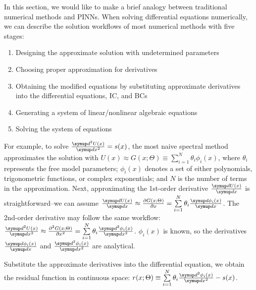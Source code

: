 In this section, we would like to make a brief analogy between traditional numerical methods and PINNs.
When solving differential equations numerically, we can describe the solution workflows of most numerical methods with five stages:
\begin{enumerate}[nolistsep]
    \item Designing the approximate solution with undetermined parameters
    \item Choosing proper approximation for derivatives
    \item Obtaining the modified equations by substituting approximate derivatives into the differential equations, IC, and BCs
    \item Generating a system of linear/nonlinear algebraic equations
    \item Solving the system of equations
\end{enumerate}

For example, to solve $\frac{\diff^2 U(x)}{\diff x^2}=s(x)$, the most naive spectral method \cite{trefethen_spectral_2000} approximates the solution with $U(x)\approx G(x; \Theta)\equiv\sum\limits_{i=1}^{N}\theta_i\phi_i(x)$, where $\theta_i$ represents the free model parameters; $\phi_i(x)$ denotes a set of either polynomials, trigonometric functions, or complex exponentials; and $N$ is the number of terms in the approximation.
Next, approximating the 1st-order derivative $\frac{\diff U(x)}{\diff x}$ is straightforward--we can assume $\frac{\diff U(x)}{\diff x} \approx \pdiff{G(x; \Theta)}{x}=\sum\limits_{i=1}^{N}\theta_i \frac{\diff \phi_i(x)}{\diff x}$.
The 2nd-order derivative may follow the same workflow: $\frac{\diff^2 U(x)}{\diff x^2} \approx \frac{\partial^2 G(x; \Theta)}{\partial x^2}=\sum\limits_{i=1}^{N}\theta_i \frac{\diff^2 \phi_i(x)}{\diff x^2}$.
$\phi_i(x)$ is known, so the derivatives $\frac{\diff \phi_i(x)}{\diff x}$ and $\frac{\diff^2 \phi_i(x)}{\diff x^2}$ are analytical.

Substitute the approximate derivatives into the differential equation, we obtain the residual function in continuous space: $r(x; \Theta) \equiv \sum\limits_{i=1}^{N}\theta_i \frac{\diff^2 \phi_i(x)}{\diff x^2} - s(x)$.

